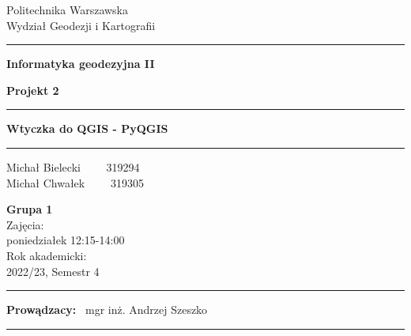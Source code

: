 \documentclass[a4paper,titleauthor]{mwart}
\begin{document}
	\begin{titlepage}
		
		\begin{center}
			Politechnika Warszawska \\
			Wydział Geodezji i Kartografii
		\end{center}
		
		\hrule
		\vspace*{1cm}
		\begin{center}
			\Large{\textbf{Informatyka geodezyjna II}}
		\end{center}
		
		
		\vspace*{2cm}
		\begin{center}
			\large{\textbf{Projekt 2}} 
		\end{center}
		\vspace{3cm}
		\hrule
		
		\begin{center}
			\Large{\textbf{Wtyczka do QGIS - PyQGIS}}
		\end{center}
		\hrule
		
		\vspace*{2cm}
		\begin{center}
			\large{Michał Bielecki \ \ \ \ 319294}\\ 
			\large{Michał Chwałek \ \ \ \ 319305} 
		\end{center}
		
		\vspace*{3cm}
		
		\begin{center}
			\normalsize{\textbf{Grupa 1}}\\
			\small{Zajęcia: \\poniedziałek 12:15-14:00} \\
			\small{Rok akademicki:\\ 2022/23, Semestr 4}
		\end{center}
		
		\vspace*{3cm}
		\hrule
		\begin{center}
			\large{\textbf{Prowądzacy:} \ mgr inż. Andrzej Szeszko}
		\end{center}
		\hrule
		
		
	\end{titlepage}
	
\newpage
\tableofcontents
\newpage
	
\end{document}
